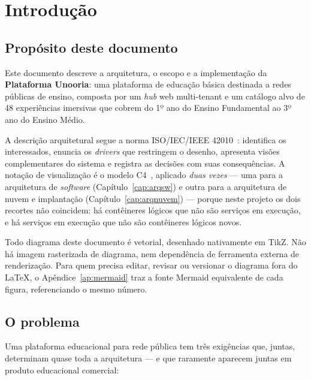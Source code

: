 \chapter{Introdução}
\label{cap:introducao}

\section{Propósito deste documento}

Este documento descreve a arquitetura, o escopo e a implementação da
\textbf{Plataforma Unooria}: uma plataforma de educação básica destinada a redes
públicas de ensino, composta por um \emph{hub} web multi-tenant e um catálogo
alvo de 48 experiências imersivas que cobrem do 1º ano do Ensino Fundamental ao
3º ano do Ensino Médio.

A descrição arquitetural segue a norma ISO/IEC/IEEE 42010~\cite{iso42010}:
identifica os interessados, enuncia os \emph{drivers} que restringem o desenho,
apresenta visões complementares do sistema e registra as decisões com suas
consequências. A notação de visualização é o modelo C4~\cite{c4model,brown2024c4},
aplicado \emph{duas vezes} --- uma para a arquitetura de \emph{software}
(Capítulo~\ref{cap:arqsw}) e outra para a arquitetura de nuvem e implantação
(Capítulo~\ref{cap:arqnuvem}) --- porque neste projeto os dois recortes não
coincidem: há contêineres lógicos que não são serviços em execução, e há
serviços em execução que não são contêineres lógicos novos.

\begin{nota}
Todo diagrama deste documento é vetorial, desenhado nativamente em TikZ. Não há
imagem rasterizada de diagrama, nem dependência de ferramenta externa de
renderização. Para quem precisa editar, revisar ou versionar o diagrama fora do
\LaTeX, o Apêndice~\ref{ap:mermaid} traz a fonte Mermaid equivalente de cada
figura, referenciando o mesmo número.
\end{nota}

\section{O problema}

Uma plataforma educacional para rede pública tem três exigências que, juntas,
determinam quase toda a arquitetura --- e que raramente aparecem juntas em
produto educacional comercial:

